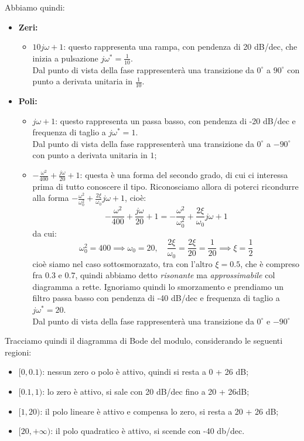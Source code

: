 \documentclass[a4paper,11pt]{article}
\begin{document}
Abbiamo quindi:
\begin{itemize}
	\item \textbf{Zeri:}
		\begin{itemize}
			\item $10 j \omega + 1$: questo rappresenta una rampa, con pendenza di 20 dB/dec, che inizia a pulsazione $j \omega^* = \frac{1}{10}$. \\ 
				Dal punto di vista della fase rappresenterà una transizione da $0^\circ$ a $90^\circ$ con punto a derivata unitaria in $\frac{1}{10}$.
		\end{itemize}
	\item \textbf{Poli:}
		\begin{itemize}
			\item $j \omega + 1$: questo rappresenta un passa basso, con pendenza di -20 dB/dec e frequenza di taglio a $j \omega^* = 1$. \\ 
				Dal punto di vista della fase rappresenterà una transizione da $0^\circ$ a $-90^\circ$ con punto a derivata unitaria in $1$;
			\item $-\frac{\omega^2}{400} + \frac{j \omega}{20} + 1$: questa è una forma del secondo grado, di cui ci interessa prima di tutto conoscere il tipo.
				Riconosciamo allora di poterci ricondurre alla forma $-\frac{\omega^2}{\omega_0^2} + \frac{2\xi}{\omega_0} j \omega + 1$, cioè:
				$$
				-\frac{\omega^2}{400} + \frac{j \omega}{20} + 1 = -\frac{\omega^2}{\omega_0^2} + \frac{2\xi}{\omega_0} j \omega + 1
				$$
				da cui:
				$$
				\omega_0^2 = 400 \implies \omega_0 = 20, \quad \frac{2\xi}{\omega_0} = \frac{2\xi}{20} = \frac{1}{20} \implies \xi = \frac{1}{2}
				$$
				cioè siamo nel caso sottosmorazato, tra con l'altro $\xi = 0.5$, che è compreso fra $0.3$ e $0.7$, quindi abbiamo detto \textit{risonante} ma \textit{approssimabile} col diagramma a rette.
				Ignoriamo quindi lo smorzamento e prendiamo un filtro passa basso con pendenza di -40 dB/dec e frequenza di taglio a $j \omega^* = 20$. \\ 
				Dal punto di vista della fase rappresenterà una transizione da $0^\circ$ e $-90^\circ$
		\end{itemize}
\end{itemize}

Tracciamo quindi il diagramma di Bode del modulo, considerando le seguenti regioni:
\begin{itemize}
	\item $[0, 0.1)$: nessun zero o polo è attivo, quindi si resta a 0 + 26 dB;
	\item $[0.1, 1)$: lo zero è attivo, si sale con 20 dB/dec fino a 20 + 26dB;
	\item $[1, 20)$: il polo lineare è attivo e compensa lo zero, si resta a 20 + 26 dB;
	\item $[20, +\infty)$: il polo quadratico è attivo, si scende con -40 db/dec.
\end{itemize}
\end{document}
